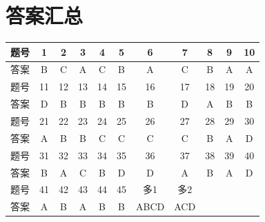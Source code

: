 ﻿\documentclass{ctexart}
\numberwithin{figure}{section}
\numberwithin{equation}{section}
\begin{document}
\section*{答案汇总}

\begin{center}
\begin{tabular}{|c|c|c|c|c|c|c|c|c|c|c|}
\hline
题号 & 1 & 2 & 3 & 4 & 5 & 6 & 7 & 8 & 9 & 10 \\ \hline
答案 & B & C & A & C & B & A & C & B & A & A \\ \hline
题号 & 11 & 12 & 13 & 14 & 15 & 16 & 17 & 18 & 19 & 20 \\ \hline
答案 & D & B & B & B & B & B & D & A & B & B \\ \hline
题号 & 21 & 22 & 23 & 24 & 25 & 26 & 27 & 28 & 29 & 30 \\ \hline
答案 & A & B & B & C & C & C & C & B & A & D \\ \hline
题号 & 31 & 32 & 33 & 34 & 35 & 36 & 37 & 38 & 39 & 40 \\ \hline
答案 & B & A & C & B & D & D & A & B & A & D \\ \hline
题号 & 41 & 42 & 43 & 44 & 45 & 多1 & 多2 &  &  &  \\ \hline
答案 & A & B & A & B & B & ABCD & ACD &  &  &  \\ \hline
\end{tabular}
\end{center}
\end{document}

